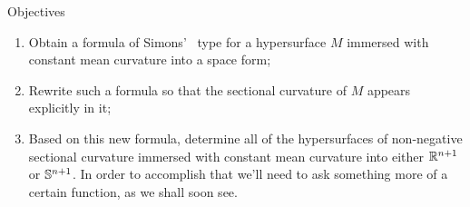 \begin{frame}{Objectives}
  \begin{enumerate}
    \item
      Obtain a formula of Simons'~\cite{simons_minimal_1968} type for a
      hypersurface \(M\) immersed with constant mean curvature into a space
      form;
    \item
      Rewrite such a formula so that the sectional curvature of \(M\) appears
      explicitly in it;
    \item
      Based on this new formula, determine all of the hypersurfaces of
      non-negative sectional curvature immersed with constant mean curvature
      into either \(\mathbb{R}^{n+1}\) or \(\mathbb{S}^{n+1}\). In order to
      accomplish that we'll need to ask something more of a certain function,
      as we shall soon see. 
  \end{enumerate}
\end{frame}
